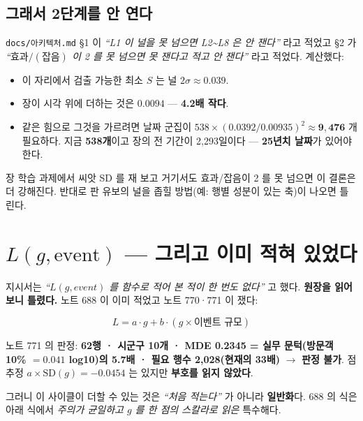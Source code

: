\documentclass[10pt]{article}
\begin{document}
\subsection{그래서 2단계를 안 연다}

\texttt{docs/아키텍처.md} §1 이 \emph{``L1 이 널을 못 넘으면 L2\textasciitilde L8 은
안 잰다''} 라고 적었고 §2 가 \emph{``$\text{효과}/(\text{잡음})$ 이 2 를 못 넘으면
못 잰다고 적고 안 잰다''} 라고 적었다. 계산했다:

\begin{itemize}\setlength\itemsep{1pt}
\item 이 자리에서 검출 가능한 최소 $S$ 는 널 $2\sigma \approx \mathbf{0.039}$.
\item 장이 시각 위에 더하는 것은 $\mathbf{0.0094}$ --- \textbf{4.2배 작다}.
\item 같은 힘으로 그것을 가르려면 날짜 군집이
$538 \times (0.0392/0.00935)^2 \approx \mathbf{9{,}476}$ 개 필요하다.
지금 \textbf{538개}이고 장의 전 기간이 2,293일이다 ---
\textbf{25년치 날짜}가 있어야 한다.
\end{itemize}

{장 학습 과제에서 씨앗 SD 를 재 보고 거기서도 효과/잡음이 2 를 못 넘으면
이 결론은 더 강해진다. 반대로 판 유보의 널을 좁힐 방법(예: 행별 성분이 있는 축)이
나오면 틀린다.}

\section{$L(g,\text{event})$ --- 그리고 이미 적혀 있었다}

지시서는 \emph{``$L(g,event)$ 를 함수로 적어 본 적이 한 번도 없다''} 고 했다.
\textbf{원장을 읽어 보니 틀렸다.} 노트 688 이 이미 적었고 노트 770·771 이 쟀다:

\[
L = a\cdot g + b\cdot (g \times \text{이벤트 규모})
\]

노트 771 의 판정: \textbf{62행 · 시군구 10개 · MDE 0.2345 = 실무 문턱(방문객 10\%
$=0.041$ log10)의 5.7배 · 필요 행수 2,028(현재의 33배)} $\to$ \textbf{판정 불가}.
점추정 $a\times \mathrm{SD}(g) = -0.0454$ 는 있지만 \textbf{부호를 읽지 않았다}.

그러니 이 사이클이 더할 수 있는 것은 \emph{``처음 적는다''} 가 아니라
\textbf{일반화}다. 688 의 식은 아래 식에서 \emph{주의가 균일하고 $g$ 를 한 점의
스칼라로 읽은} 특수해다.
\end{document}
